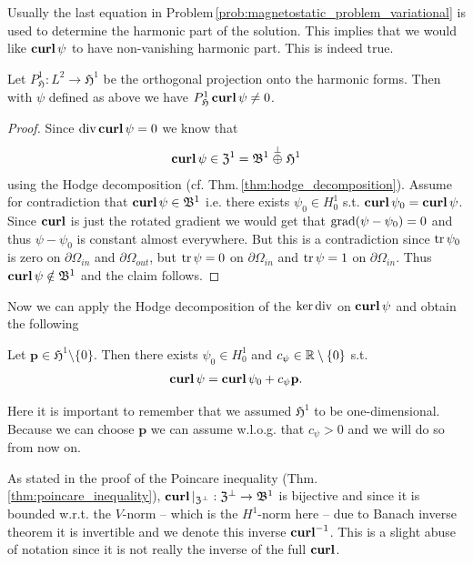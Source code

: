 \documentclass[../master_thesis.tex]{subfiles}
\begin{document}
Usually the last equation in Problem\,\ref{prob:magnetostatic_problem_variational} 
is used to determine the harmonic part of the 
solution. This implies that we would like $\veccurl \psi$ to have 
non-vanishing harmonic part. This is indeed true.
\begin{proposition}
    Let $P_\mathfrak{H}^1: L^2 \rightarrow \mathfrak{H}^1$ be the orthogonal
    projection onto the harmonic forms. Then with $\psi$ defined as above 
    we have $P_\mathfrak{H}^1\veccurl \psi \neq 0$.
\end{proposition}
\begin{proof}
    Since $\diver \veccurl \psi = 0$ we know that 
    \begin{align*}
        \veccurl \psi \in \mathfrak{Z}^1 = \mathfrak{B}^1 \stackrel{\perp}{\oplus} \mathfrak{H}^1
    \end{align*}
    using the Hodge decomposition (cf. Thm.\,\ref{thm:hodge_decomposition}). 
    Assume for contradiction that $\veccurl \psi \in \mathfrak{B}^1$ i.e. there exists 
    $\psi_0 \in H^1_0$ s.t. $\veccurl \psi_0 = \veccurl \psi$. 
    Since $\veccurl$ is just the rotated gradient we would get that 
    $\operatorname{grad} (\psi - \psi_0) = 0$ and thus $\psi - \psi_0$ is constant almost 
    everywhere. But this is a contradiction since $\operatorname{tr} \psi_0$ is zero on $\partial\Omega_{in}$ 
    and $\partial \Omega_{out}$, but $\operatorname{tr} \psi = 0$ on $\partial\Omega_{in}$ and 
    $\operatorname{tr} \psi = 1$ on $\partial\Omega_{in}$. 
    Thus $\veccurl \psi \notin \mathfrak{B}^1$ and the claim follows.
\end{proof}
Now we can apply the Hodge decomposition of the $\ker \diver$ on
$\veccurl \psi$ and obtain the following
\begin{corollary}
    Let $\mathbf{p}\in \mathfrak{H}^1 \setminus \{ 0 \}$. Then there exists 
    $\psi_0 \in H^1_0$ and $c_\psi \in \real \setminus \{ 0 \}$ s.t. 
    \begin{align*}
        \veccurl \psi = \veccurl \psi_0 + c_\psi \mathbf{p}.
    \end{align*}
\end{corollary}
Here it is important to remember that we assumed $\mathfrak{H}^1$ to be one-dimensional.
Because we can choose $\mathbf{p}$ we can assume w.l.o.g. that $c_\psi > 0$ and 
we will do so from now on.

As stated in the proof of the Poincare inequality (Thm.\,\ref{thm:poincare_inequality}), 
$\veccurl| _{\mathfrak{Z}^\perp}: \mathfrak{Z}^\perp \rightarrow \mathfrak{B}^1$
is bijective and since it is bounded w.r.t. the $V$-norm -- which is the 
$H^1$-norm here -- due to Banach inverse theorem it is invertible and we denote this 
inverse $\veccurl^{-1}$. This is a slight abuse of notation since it is not really 
the inverse of the full $\veccurl$.
\end{document}
